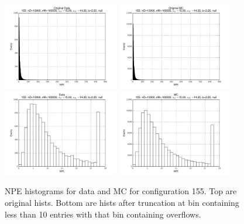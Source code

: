  \begin{figure}[htbp] \begin{center} 
\includegraphics[width=0.45\textwidth]{../FIGURES/155/FIG_Original_Data.pdf} 
\includegraphics[width=0.45\textwidth]{../FIGURES/155/FIG_Original_MC.pdf} 
\includegraphics[width=0.45\textwidth]{../FIGURES/155/FIG_Data.pdf} 
\includegraphics[width=0.45\textwidth]{../FIGURES/155/FIG_MC.pdf} 
\caption{NPE histograms for data and MC for configuration 155. Top are original hists. Bottom are hists after truncation at bin containing less than 10 entries with that bin containing overflows.} 
\label{tab:npe_155} 
\end{center} \end{figure} 

